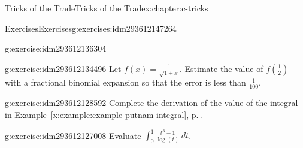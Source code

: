 \documentclass[twoside,10pt,]{book}
\newcommand{\xreffont}{\relax}
\numberwithin{equation}{section}
\begin{document}
\begin{chapterptx}{Tricks of the Trade}{}{Tricks of the Trade}{}{}{x:chapter:c-tricks}
\begin{exercises-section}{Exercises}{}{Exercises}{}{}{g:exercises:idm293612147264}
\begin{divisionexercise}{3}{}{}{g:exercise:idm293612136304}
%
\end{divisionexercise}%
\begin{divisionexercise}{4}{}{}{g:exercise:idm293612134496}%
Let \(f(x)=\frac{1}{\sqrt{1+x}}\).  Estimate the value of \(f(\frac{1}{2})\) with a fractional binomial expansion so that the error is less than \(\frac{1}{100}\).%
\end{divisionexercise}%
\begin{divisionexercise}{5}{}{}{g:exercise:idm293612128592}%
Complete the derivation of the value of the integral in \hyperref[x:example:example-putnam-integral]{Example~{\xreffont\ref{x:example:example-putnam-integral}}, p.\,\pageref{x:example:example-putnam-integral}}.%
\end{divisionexercise}%
\begin{divisionexercise}{6}{}{}{g:exercise:idm293612127008}%
Evaluate \(\int_0^1 \frac{t^3-1}{\log (t)} \, dt\).%
\end{divisionexercise}%
\end{exercises-section}
\end{chapterptx}
%
%
\typeout{************************************************}
\typeout{************************************************}
%
\end{document}
